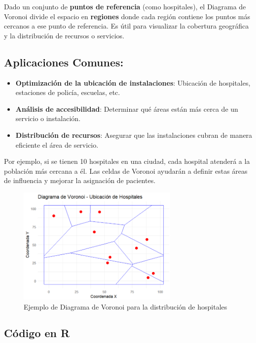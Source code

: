 \documentclass{article}
\begin{document}
{Dado un conjunto de \textbf{puntos de referencia} (como hospitales), el Diagrama de Voronoi divide el espacio en \textbf{regiones} donde cada región contiene los puntos más cercanos a ese punto de referencia. Es útil para visualizar la cobertura geográfica y la distribución de recursos o servicios.
	
\subsection*{\small Aplicaciones Comunes:}
\begin{itemize}
	\item \small \textbf{Optimización de la ubicación de instalaciones}: Ubicación de hospitales, estaciones de policía, escuelas, etc.
	\item \small \textbf{Análisis de accesibilidad}: Determinar qué áreas están más cerca de un servicio o instalación.
	\item \small \textbf{Distribución de recursos}: Asegurar que las instalaciones cubran de manera eficiente el área de servicio.
\end{itemize}


Por ejemplo, si se tienen 10 hospitales en una ciudad, cada hospital atenderá a la población más cercana a él. Las celdas de Voronoi ayudarán a definir estas áreas de influencia y mejorar la asignación de pacientes.

\begin{figure}[H]  %
	\centering
	\includegraphics[width=0.7\textwidth]{op.png}  %
	\caption{Ejemplo de Diagrama de Voronoi para la distribución de hospitales}
	\label{fig:voronoi}
\end{figure}

\subsection*{\small Código en R }

}
\end{document}
